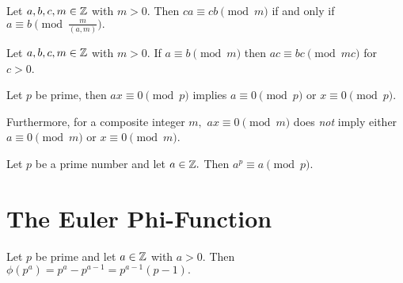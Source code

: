 \documentclass[letterpaper, 11 pt]{ximera}
\begin{document}


\begin{proposition}[Proposition 2.5]\label{prop:equiv-gcd}
    Let $a,b,c,m\in\mathbb Z$ with $m>0.$ Then $ca\equiv cb\pmod{m}$ if and only if $a\equiv b\pmod{\tfrac{m}{(a,m)}}.$
\end{proposition}


\begin{lemma}\label{ex:equiv-upmod}
    Let $a,b,c,m\in\mathbb Z$ with $m>0.$ If $a\equiv b \pmod{m}$ then $ac\equiv bc \pmod{mc}$ for $c>0$.
\end{lemma}


\begin{proposition}\label{prop:zero-divisors}
    Let $p$ be prime, then $ax\equiv 0\pmod{p}$ implies $a\equiv 0\pmod{p}$ or $x\equiv 0\pmod{p}.$ 

    Furthermore, for a composite integer $m,$ $ax\equiv 0\pmod{m}$ does \emph{not} imply either $a\equiv 0\pmod{m}$ or $x\equiv 0\pmod{m}.$ 
\end{proposition}

\begin{corollary}[Corollary 2.15]\label{cor:a_power_prime_mod}
    Let $p$ be a prime number and let $a\in\mathbb Z.$ Then $a^p\equiv a\pmod{p}.$
\end{corollary}

\section{The Euler Phi-Function}

\begin{theorem}[Theorem 3.3]\label{thm:phi-prime-power}
    Let $p$ be prime and let $a\in\mathbb Z$ with $a>0.$ Then $\phi(p^a)=p^a-p^{a-1}=p^{a-1}(p-1).$
\end{theorem}
\end{document}
